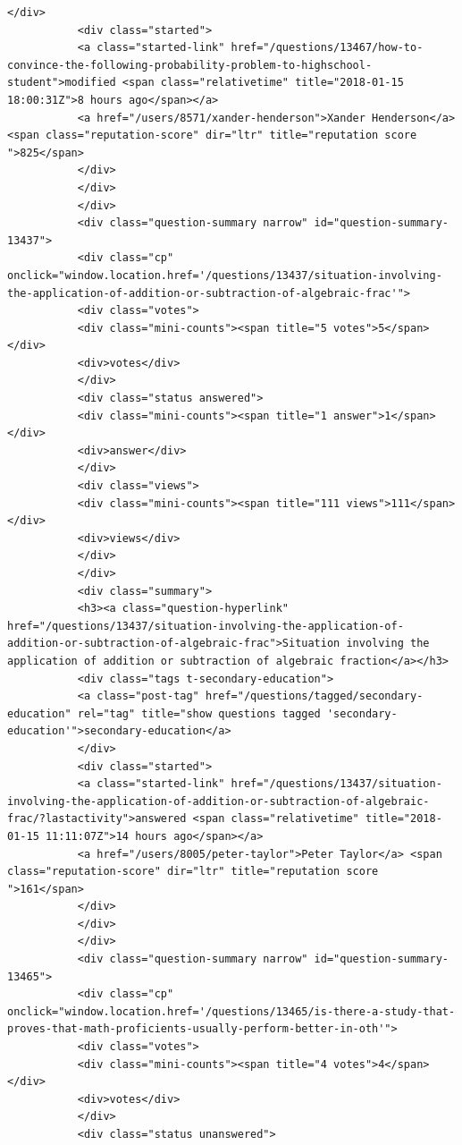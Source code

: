 \documentclass[11pt]{article}
\begin{document}
\begin{Verbatim}[commandchars=\\\{\}]
           </div>
           <div class="started">
           <a class="started-link" href="/questions/13467/how-to-convince-the-following-probability-problem-to-highschool-student">modified <span class="relativetime" title="2018-01-15 18:00:31Z">8 hours ago</span></a>
           <a href="/users/8571/xander-henderson">Xander Henderson</a> <span class="reputation-score" dir="ltr" title="reputation score ">825</span>
           </div>
           </div>
           </div>
           <div class="question-summary narrow" id="question-summary-13437">
           <div class="cp" onclick="window.location.href='/questions/13437/situation-involving-the-application-of-addition-or-subtraction-of-algebraic-frac'">
           <div class="votes">
           <div class="mini-counts"><span title="5 votes">5</span></div>
           <div>votes</div>
           </div>
           <div class="status answered">
           <div class="mini-counts"><span title="1 answer">1</span></div>
           <div>answer</div>
           </div>
           <div class="views">
           <div class="mini-counts"><span title="111 views">111</span></div>
           <div>views</div>
           </div>
           </div>
           <div class="summary">
           <h3><a class="question-hyperlink" href="/questions/13437/situation-involving-the-application-of-addition-or-subtraction-of-algebraic-frac">Situation involving the application of addition or subtraction of algebraic fraction</a></h3>
           <div class="tags t-secondary-education">
           <a class="post-tag" href="/questions/tagged/secondary-education" rel="tag" title="show questions tagged 'secondary-education'">secondary-education</a>
           </div>
           <div class="started">
           <a class="started-link" href="/questions/13437/situation-involving-the-application-of-addition-or-subtraction-of-algebraic-frac/?lastactivity">answered <span class="relativetime" title="2018-01-15 11:11:07Z">14 hours ago</span></a>
           <a href="/users/8005/peter-taylor">Peter Taylor</a> <span class="reputation-score" dir="ltr" title="reputation score ">161</span>
           </div>
           </div>
           </div>
           <div class="question-summary narrow" id="question-summary-13465">
           <div class="cp" onclick="window.location.href='/questions/13465/is-there-a-study-that-proves-that-math-proficients-usually-perform-better-in-oth'">
           <div class="votes">
           <div class="mini-counts"><span title="4 votes">4</span></div>
           <div>votes</div>
           </div>
           <div class="status unanswered">

\end{Verbatim}
\end{document}
